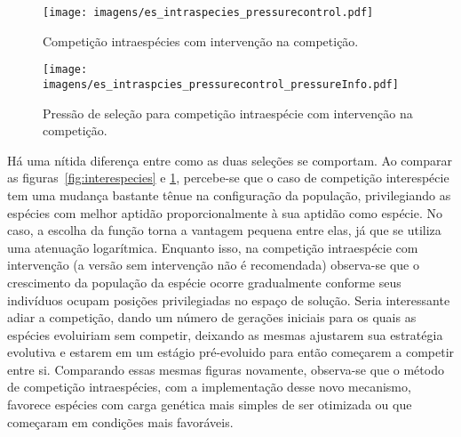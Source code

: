 \begin{figure}[h!t]
\centering
\texttt{[image: imagens/es\_intraspecies\_pressurecontrol.pdf]}
\caption[Competição intraespécies com intervenção na
competição.]{Competição intraespécies com intervenção na competição.}
\label{fig:intraspecies_pressurecontrol}
\end{figure}

\begin{figure}[h!t]
\centering
\texttt{[image: imagens/es\_intraspcies\_pressurecontrol\_pressureInfo.pdf]}
\caption[Pressão de seleção para competição intraespécie com 
intervenção na competição.]{Pressão de seleção para competição
intraespécie com intervenção na competição.}
\label{fig:intraspecies_pressurecontrol_info}
\end{figure}

Há uma nítida diferença entre como as duas seleções se comportam. Ao
comparar as figuras~\ref{fig:interespecies} e
\ref{fig:intraspecies_pressurecontrol}, percebe-se que o caso de
competição interespécie tem uma mudança bastante tênue na configuração
da população, privilegiando as espécies com melhor aptidão
proporcionalmente à sua aptidão como espécie. No caso, a escolha da
função torna a vantagem pequena entre elas, já que se utiliza uma
atenuação logarítmica. Enquanto isso, na competição intraespécie com
intervenção (a versão sem intervenção não é recomendada) observa-se
que o crescimento da população da espécie ocorre gradualmente conforme
seus indivíduos ocupam posições privilegiadas no espaço de
solução. Seria interessante adiar a competição, dando um número de
gerações iniciais para os quais as espécies evoluiriam sem competir,
deixando as mesmas ajustarem sua estratégia evolutiva e estarem
em um estágio pré-evoluido para então começarem a competir entre si.
Comparando essas mesmas figuras novamente, observa-se que o método
de competição intraespécies, com a implementação desse novo mecanismo,
favorece espécies com carga genética mais simples de ser otimizada ou
que começaram em condições mais favoráveis.

